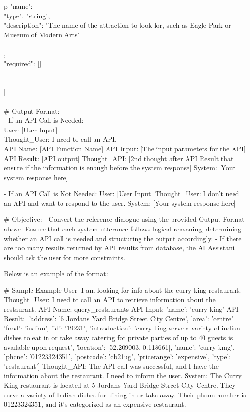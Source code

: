 \begin{table*}
\begin{tabular}{p\linewidth}
{{{                "name": {\\
                    "type": "string",\\
                    "description": "The name of the attraction to look for, such as Eagle Park or Museum of Modern Arts"\\
                }\\
            },\\
            "required": []\\
        }\\
    }\\
]\\
\\
# Output Format:\\
- If an API Call is Needed:\\
	User: [User Input]\\
    Thought\_User: I need to call an API.\\
    API Name: [API Function Name]
    API Input: [The input parameters for the API]
    API Result: [API output]
    Thought\_API: [2nd thought after API Result that ensure if the information is enough before the system response]
	System: [Your system response here]

- If an API Call is Not Needed:
	User: [User Input]
    Thought\_User: I don't need an API and want to respond to the user.
    System: [Your system response here]

# Objective: 
- Convert the reference dialogue using the provided Output Format above. Ensure that each system utterance follows logical reasoning, determining whether an API call is needed and structuring the output accordingly.
- If there are too many results returned by API results from database, the AI Assistant should ask the user for more constraints.

Below is an example of the format:

# Sample Example
User: I am looking for info about the curry king restaurant.  
Thought\_User: I need to call an API to retrieve information about the restaurant.  
API Name: query\_restaurants  
API Input: {'name': 'curry king'}  
API Result: [{'address': '5 Jordans Yard Bridge Street City Centre', 'area': 'centre', 'food': 'indian', 'id': '19231', 'introduction': 'curry king serve a variety of indian dishes to eat in or take away catering for private parties of up to 40 guests is available upon request', 'location': [52.209003, 0.118661], 'name': 'curry king', 'phone': '01223324351', 'postcode': 'cb21ug', 'pricerange': 'expensive', 'type': 'restaurant'}]  
Thought\_API: The API call was successful, and I have the information about the restaurant. I need to inform the user.  
System: The Curry King restaurant is located at 5 Jordans Yard Bridge Street City Centre. They serve a variety of Indian dishes for dining in or take away. Their phone number is 01223324351, and it's categorized as an expensive restaurant.


\end{tabular}
\end{table*}
